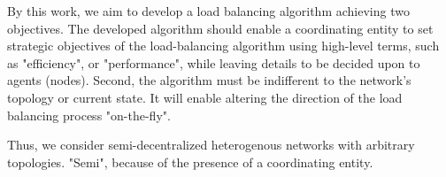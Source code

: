 By this work, we aim to develop a load balancing algorithm achieving two objectives.
The developed algorithm should enable a coordinating entity to set strategic objectives of the load-balancing algorithm using high-level terms, such as "efficiency", or "performance", while leaving details to be decided upon to agents (nodes).
Second, the algorithm must be indifferent to the network's topology or current state. It will enable altering the direction of the load balancing process "on-the-fly".

Thus, we consider semi-decentralized heterogenous networks with arbitrary topologies. "Semi", because of the presence of a coordinating entity.

